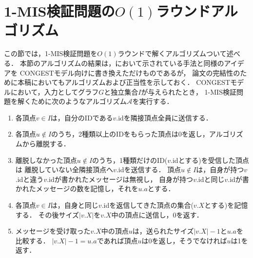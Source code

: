 \documentclass[11pt,a4paper]{jarticle}
\newcommand{\CONGEST}{\textsf{CONGEST}}
\theoremstyle{definition}
\begin{document}
\section{1-MIS検証問題の$O(1)$ラウンドアルゴリズム}
この節では，1-MIS検証問題を$O(1)$ラウンドで解くアルゴリズムついて述べる．
本節のアルゴリズムの結果は，\cite{tanaka2019self}において示されている手法と同様のアイデアを
{\CONGEST}モデル向けに書き換えただけものであるが，
論文の完結性のために本稿においてもアルゴリズムおよび正当性を示しておく．
{\CONGEST}モデルにおいて，入力としてグラフ$G$と独立集合$I$が与えられたとき，
1-MIS検証問題を解くために次のようなアルゴリズム$\mathcal{A}$を実行する．
\begin{enumerate}
\item 各頂点$v \in I$は，自分のIDである$v$.idを隣接頂点全員に送信する．
\item 各頂点$u \notin I$のうち，2種類以上のIDをもらった頂点は0を返し，アルゴリズムから離脱する．
\item 離脱しなかった頂点$u \notin I$のうち，1種類だけのID($v$.idとする)を受信した頂点は
離脱していない全隣接頂点へ$v$.idを送信する．
頂点$u \notin I$は，自身が持つ$v$.idと違う$v$.idが書かれたメッセージは無視し，
自身が持つ$v$.idと同じ$v$.idが書かれたメッセージの数を記憶し，それを$u.a$とする．
\item 各頂点$v \in I$は，自身と同じ$v$.idを返信してきた頂点の集合($v.X$とする)を記憶する．
その後サイズ$|v.X|$を$v.X$中の頂点に送信し，0を返す．
\item メッセージを受け取った$v.X$中の頂点$u$は，送られたサイズ$|v.X| - 1$と$u.a$を比較する．
$|v.X | - 1 = u.a$であれば頂点$u$は$0$を返し，そうでなければ$u$は1を返す．
\end{enumerate}
\end{document}
